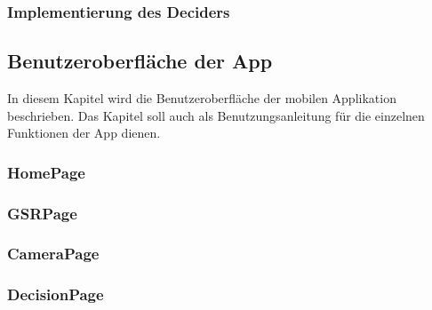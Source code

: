 \subsubsection{Implementierung des Deciders}
\subsection{Benutzeroberfläche der App}
In diesem Kapitel wird die Benutzeroberfläche der mobilen Applikation beschrieben. Das Kapitel soll auch als Benutzungsanleitung für die einzelnen Funktionen der App dienen.
\subsubsection{HomePage}
\subsubsection{GSRPage}
\subsubsection{CameraPage}
\subsubsection{DecisionPage}
